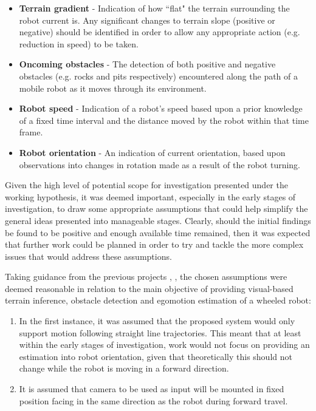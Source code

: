 \begin{itemize}
	\item \textbf{Terrain gradient} - Indication of how ``flat" the terrain surrounding the robot current is. Any significant changes to terrain slope (positive or negative) should be identified in order to allow any appropriate action (e.g. reduction in speed) to be taken.
	\item  \textbf{Oncoming obstacles} - The detection of both positive and negative obstacles (e.g. rocks and pits respectively) encountered along the path of a mobile robot as it moves through its environment. 
	\item \textbf{Robot speed} - Indication of a robot's speed based upon a prior knowledge of a fixed time interval and the distance moved by the robot within that time frame.
	\item \textbf{Robot orientation} - An indication of current orientation, based upon observations into changes in rotation made as a result of the robot turning. 
	
\end{itemize} 

Given the high level of potential scope for investigation presented under the working hypothesis, it was deemed important, especially in the early stages of investigation, to draw some appropriate assumptions that could help simplify the general ideas presented into manageable stages. Clearly, should the initial findings be found to be positive and enough available time remained, then it was expected that further work could be planned in order to try and tackle the more complex issues that would address these assumptions.

Taking guidance from the previous projects \cite{campbell}, \cite{low}, the chosen assumptions were deemed reasonable in relation to the main objective of providing visual-based terrain inference, obstacle detection and egomotion estimation of a wheeled robot:

 \begin{enumerate}
 	\item In the first instance, it was assumed that the proposed system would only support motion following straight line trajectories. This meant that at least within the early stages of investigation, work would not focus on providing an estimation into robot orientation, given that theoretically this should not change while the robot is moving in a forward direction.
 	\item It is assumed that camera to be used as input will be mounted in fixed position facing in the same direction as the robot during forward travel.
 	
 \end{enumerate}

